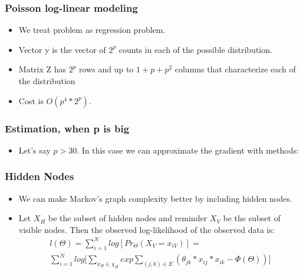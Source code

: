 \documentclass{beamer}
\begin{document}
\begin{frame}
\frametitle{ Poisson log-linear modeling}
\begin{itemize}
\item We treat problem as regression problem.
\item Vector y is the vector of $2^p$ counts in each of the possible distribution.
\item Matrix Z has $2^p$ rows and up to $1+p+p^2$ columns that characterize each of the distribution
\item Cost is $O(p^4 * 2^p)$. 
\end{itemize}
\end{frame}

\begin{frame}
\frametitle{ Estimation, when p is big}
\begin{itemize}
\item Let's say $p > 30$. In this case we can approximate the gradient with methods:
\end{itemize}
\end{frame}

\begin{frame}
\frametitle{ Hidden Nodes}
\begin{itemize}
\item We can make Markov's graph complexity better by including hidden nodes.
\item Let $X_H$ be the subset of hidden nodes and reminder $X_V$ be the subset of visible nodes. Then the observed log-likelihood of the observed data is:
\begin{align*}
l(\Theta) = \sum_{i=1}^N log[Pr_{\Theta}(X_V = x_{iV})] = \\ \sum_{i=1}^N log\Big[\sum_{x_H \in \chi_H} exp \sum_{(j, k) \in E} (\theta_{jk} * x_{ij} * x_{ik} - \Phi(\Theta))\Big]
\end{align*}
\end{itemize}
\end{frame}
\end{document}

